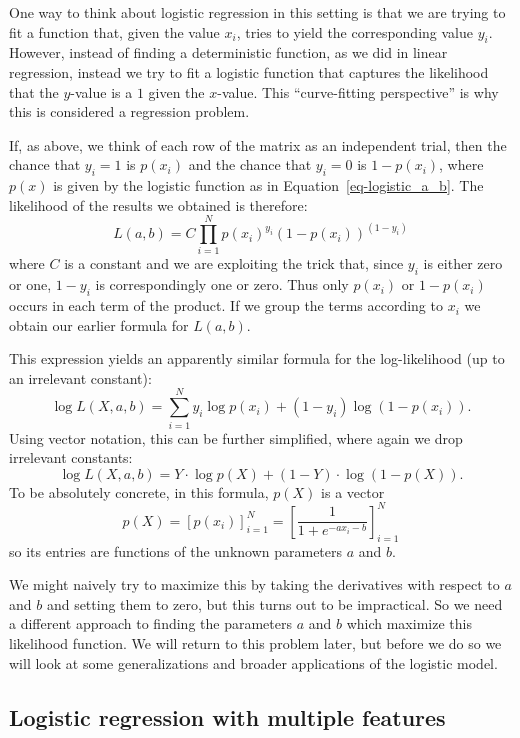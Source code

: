 \documentclass[
  11pt,
  letterpaper,
]{scrbook}
\theoremstyle{plain}
\theoremstyle{remark}
\begin{document}
One way to think about logistic regression in this setting is that we
are trying to fit a function that, given the value \(x_i\), tries to
yield the corresponding value \(y_i\). However, instead of finding a
deterministic function, as we did in linear regression, instead we try
to fit a logistic function that captures the likelihood that the
\(y\)-value is a \(1\) given the \(x\)-value. This ``curve-fitting
perspective'' is why this is considered a regression problem.

If, as above, we think of each row of the matrix as an independent
trial, then the chance that \(y_i=1\) is \(p(x_i)\) and the chance that
\(y_i=0\) is \(1-p(x_i)\), where \(p(x)\) is given by the logistic
function as in Equation~\ref{eq-logistic_a_b}. The likelihood of the
results we obtained is therefore: \[
L(a,b) = C \prod_{i=1}^{N} p(x_i)^{y_i}(1-p(x_i))^{(1-y_i)}
\] where \(C\) is a constant and we are exploiting the trick that, since
\(y_i\) is either zero or one, \(1-y_i\) is correspondingly one or zero.
Thus only \(p(x_i)\) or \(1-p(x_i)\) occurs in each term of the product.
If we group the terms according to \(x_i\) we obtain our earlier formula
for \(L(a,b)\).

This expression yields an apparently similar formula for the
log-likelihood (up to an irrelevant constant): \[
\log L(X,a,b) = \sum_{i=1}^{N} y_i\log p(x_i) + (1-y_i)\log (1-p(x_i)).
\] Using vector notation, this can be further simplified, where again we
drop irrelevant constants: \[
\log L(X,a,b) = Y\cdot\log p(X) + (1-Y)\cdot \log(1-p(X)).
\] To be absolutely concrete, in this formula, \(p(X)\) is a vector \[
p(X)=[p(x_i)]_{i=1}^{N} = \left[\frac{1}{1+e^{-ax_i-b}} \right]_{i=1}^{N}
\] so its entries are functions of the unknown parameters \(a\) and
\(b\).

We might naively try to maximize this by taking the derivatives with
respect to \(a\) and \(b\) and setting them to zero, but this turns out
to be impractical. So we need a different approach to finding the
parameters \(a\) and \(b\) which maximize this likelihood function. We
will return to this problem later, but before we do so we will look at
some generalizations and broader applications of the logistic model.

\hypertarget{logistic-regression-with-multiple-features}{%
\subsection{Logistic regression with multiple
features}\label{logistic-regression-with-multiple-features}}
\end{document}
